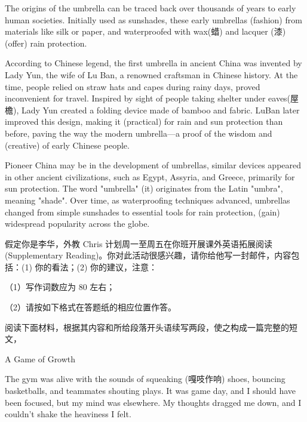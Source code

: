 \documentclass{英语试卷}
\begin{document}
\par The origins of the umbrella can be traced back over thousands of years to early human societies. Initially used as sunshades, these early umbrellas  (fashion) from materials like silk or paper, and waterproofed with wax(蜡) and lacquer (漆)  (offer) rain protection.\par
\par According to Chinese legend, the first umbrella in ancient China was invented by Lady Yun, the wife of Lu Ban, a renowned craftsman in Chinese history. At the time, people relied on straw hats and capes during rainy days,  proved inconvenient for travel. Inspired by  sight of people taking shelter under eaves(屋檐), Lady Yun created a folding device made of bamboo and fabric. LuBan later improved this design, making it  (practical) for rain and sun protection than before, paving the way  the modern umbrella—a proof of the wisdom and  (creative) of early Chinese people.\par
\par Pioneer  China may be in the development of umbrellas, similar devices appeared in other ancient civilizations, such as Egypt, Assyria, and Greece, primarily for sun protection. The word "umbrella"  (it) originates from the Latin "umbra", meaning "shade". Over time, as waterproofing techniques advanced, umbrellas changed from simple sunshades to essential tools for rain protection,  (gain) widespread popularity across the globe.\par
{}
\par 假定你是李华，外教 Chris 计划周一至周五在你班开展课外英语拓展阅读 (Supplementary Reading)。你对此活动很感兴趣，请你给他写一封邮件，内容包括：(1) 你的看法；(2) 你的建议，注意：\par
\par （1）写作词数应为 80 左右；\par
\par （2）请按如下格式在答题纸的相应位置作答。\par
{}
\par 阅读下面材料，根据其内容和所给段落开头语续写两段，使之构成一篇完整的短文，\par
\par A Game of Growth\par
\par The gym was alive with the sounds of squeaking (嘎吱作响) shoes, bouncing basketballs, and teammates shouting plays. It was game day, and I should have been focused, but my mind was elsewhere. My thoughts dragged me down, and I couldn't shake the heaviness I felt.\par
\end{document}
